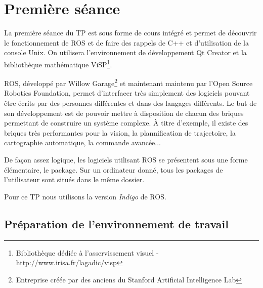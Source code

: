 \documentclass[12pt,a4paper]{article}
\begin{document}
\section{Première séance}

\hspace{12pt}La première séance du TP est sous forme de cours intégré et permet de découvrir le fonctionnement de ROS et de faire des rappels de C++ et d'utilisation de la console Unix. On utilisera l'environnement de développement Qt Creator et la bibliothèque mathématique ViSP\footnote{ Bibliothèque dédiée à l'asservissement visuel - http://www.irisa.fr/lagadic/visp}.

ROS, développé par Willow Garage\footnote{Entreprise créée par des anciens du Stanford Artificial Intelligence Lab} et maintenant maintenu par l'Open Source Robotics Foundation, permet d'interfacer très simplement des logiciels pouvant être écrits par des personnes différentes et dans des langages différents.
Le but de son développement est de pouvoir mettre à disposition de chacun des briques permettant de construire un système complexe.
À titre d'exemple, il existe des briques très performantes pour la vision, la plannification de trajectoire, la cartographie automatique, la commande avancée...

De façon assez logique, les logiciels utilisant ROS se présentent sous une forme élémentaire, le package. Sur un ordinateur donné, tous les packages de l'utilisateur sont situés dans le même dossier.

Pour ce TP nous utilisons la version \emph{Indigo} de ROS.

\subsection{Préparation de l'environnement de travail}

\def\bin{<binôme>}
\def\ros{\url{~}/ros}
\end{document}
